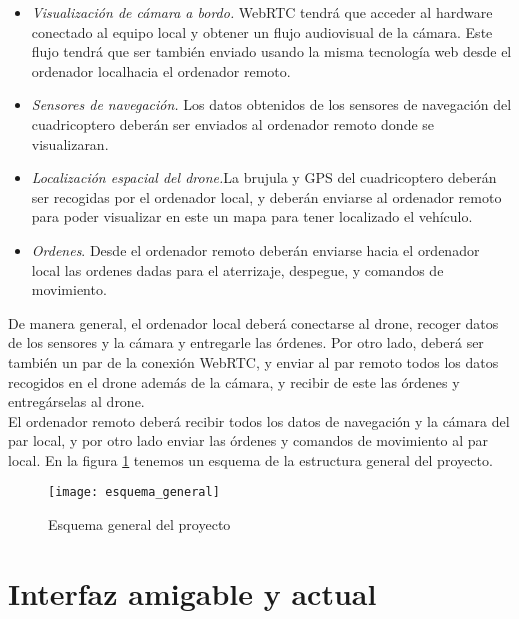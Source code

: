 \begin{itemize}

\item \emph{Visualización de cámara a bordo.} WebRTC tendrá que acceder al hardware conectado al equipo local y obtener un flujo audiovisual de la cámara. Este flujo tendrá que ser también enviado usando la misma tecnología web desde el ordenador localhacia el ordenador remoto.

\item \emph{Sensores de navegación.} Los datos obtenidos de los sensores de navegación del cuadricoptero deberán ser enviados al ordenador remoto donde se visualizaran.

\item \emph{Localización espacial del drone.}La brujula y GPS del cuadricoptero deberán ser recogidas por el ordenador local, y deberán enviarse al ordenador remoto para poder visualizar en este un mapa para tener localizado el vehículo.

\item \emph{Ordenes}. Desde el ordenador remoto deberán enviarse hacia el ordenador local las ordenes dadas para el aterrizaje, despegue, y comandos de movimiento.


\end{itemize}

De manera general, el ordenador local deberá conectarse al drone, recoger datos de los sensores y la cámara y entregarle las órdenes. Por otro lado, deberá ser también un par de la conexión WebRTC, y enviar al par remoto todos los datos recogidos en el drone además de la cámara, y recibir de este las órdenes y entregárselas al drone.\\

El ordenador remoto deberá recibir todos los datos de navegación y la cámara del par local, y por otro lado enviar las órdenes y comandos de movimiento al par local. En la figura \ref{fig:esquemageneral} tenemos un esquema de la estructura general del proyecto.\\

\begin{figure}[htb]
\centering
\texttt{[image: esquema\_general]}
\caption{Esquema general del proyecto}
\label{fig:esquemageneral}
\end{figure}

\section{Interfaz amigable y actual}

